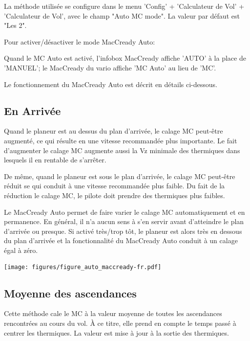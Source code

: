 La méthode utilisée se configure dans le menu 'Config' + 'Calculateur de Vol' + 'Calculateur de Vol', avec le champ "Auto MC mode". La valeur par défaut est "Les 2".

Pour activer/désactiver le mode MacCready Auto: 
\begin{quote}
\blink{}
\end{quote}

Quand le MC Auto est activé, l'infobox MacCready affiche 'AUTO' à la place de 'MANUEL'; le MacCready du vario affiche 'MC Auto' au lieu de 'MC'.

Le fonctionnement du MacCready Auto est décrit en détails ci-dessous.

\subsection*{En Arrivée}
Quand le planeur est au dessus du plan d'arrivée, le calage MC peut-être augmenté, ce qui résulte en une vitesse recommandée plus importante. Le fait d'augmenter le calage MC augmente aussi la Vz minimale des thermiques dans lesquels il en rentable de s'arrêter.

De même, quand le planeur est sous le plan d'arrivée, le calage MC peut-être réduit se qui conduit à une vitesse recommandée plus faible. Du fait de la réduction le calage MC, le pilote doit prendre des thermiques plus faibles.

Le MacCready Auto permet de faire varier le calage MC automatiquement et en permanence. En général, il n'a aucun sens à s'en servir avant d'atteindre le plan d'arrivée ou presque. Si activé très/trop tôt, le planeur est alors très en dessous du plan d'arrivée et la fonctionnalité du MacCready Auto conduit à un calage égal à zéro.

\begin{maxipage}
\begin{center}
\texttt{[image: figures/figure\_auto\_maccready-fr.pdf]}
\end{center}
\end{maxipage}

\subsection*{Moyenne des ascendances}

Cette méthode cale le MC à la valeur moyenne de toutes les ascendances rencontrées au cours du vol. À ce titre, elle prend en compte le temps passé à centrer les thermiques. La valeur est mise à jour à la sortie des thermiques.

